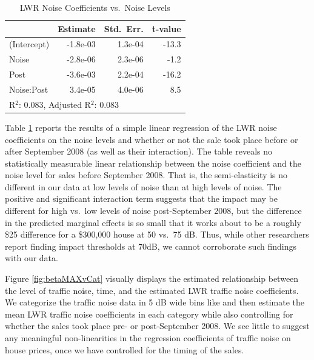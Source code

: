 \documentclass{article}\usepackage{graphicx, color}
\begin{document}
\begin{table}
\begin{center}
\caption{LWR Noise Coefficients vs.\ Noise Levels}\label{tab:LWRnonlinear}
\begin{tabular}{lrrr}
         &   Estimate & Std.\ Err. & t-value \\ \hline
(Intercept) & -1.8e-03 & 1.3e-04  &-13.3 \\
Noise       & -2.8e-06 & 2.3e-06  & -1.2 \\  
Post        & -3.6e-03 & 2.2e-04  &-16.2 \\
Noise:Post  &  3.4e-05 & 4.0e-06  &  8.5 \\ \hline
\multicolumn{4}{l}{R$^2$: 0.083,  Adjusted R$^2$: 0.083} 
\end{tabular}
\end{center}
\end{table}

Table \ref{tab:LWRnonlinear} reports the results of a simple linear regression of the LWR noise coefficients on the noise levels and whether or not the sale took place before or after September 2008 (as well as their interaction). The table reveals no statistically measurable linear relationship between the noise coefficient and the noise level for sales before September 2008. That is, the semi-elasticity is no different in our data at low levels of noise than at high levels of noise. The positive and significant interaction term suggests that the impact may be different for high vs.\ low levels of noise post-September 2008, but the difference in the predicted marginal effects is so small that it works about to be a roughly \$25 difference for a \$300,000 house at 50 vs.\ 75 dB. Thus, while other researchers report finding impact thresholds at 70dB, we cannot corroborate such findings with our data.

Figure \ref{fig:betaMAXvCat} visually displays the estimated relationship between the level of traffic noise, time, and the estimated LWR traffic noise coefficients. We categorize the traffic noise data in 5 dB wide bins like \citet{Theebe2004a} and then estimate the mean LWR traffic noise coefficients in each category while also controlling for whether the sales took place pre- or post-September 2008. We see little to suggest any meaningful non-linearities in the regression coefficients of traffic noise on house prices, once we have controlled for the timing of the sales.
\end{document}
